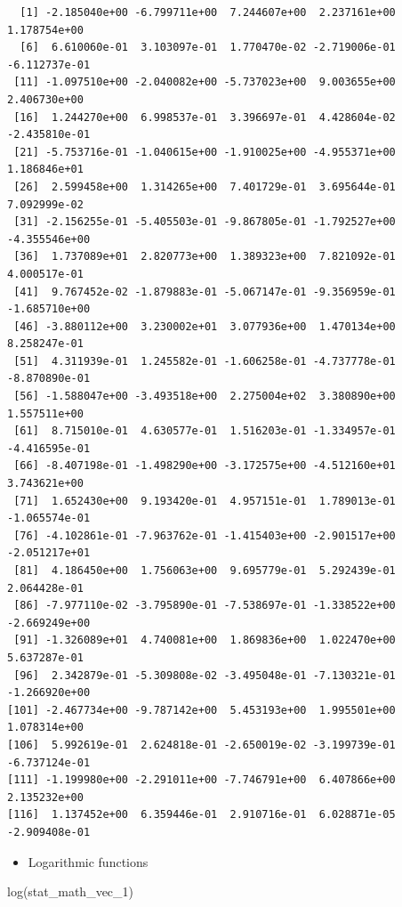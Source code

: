 \documentclass[
  letterpaper,
  DIV=11,
  numbers=noendperiod]{scrreprt}
\newenvironment{Shaded}{\begin{snugshade}}{\end{snugshade}}
\newcommand{\FunctionTok}[1]{\textcolor[rgb]{0.28,0.35,0.67}{#1}}
\newcommand{\NormalTok}[1]{\textcolor[rgb]{0.00,0.23,0.31}{#1}}
\providecommand{\tightlist}{%
  \setlength{\itemsep}{0pt}\setlength{\parskip}{0pt}}\usepackage{longtable,booktabs,array}
\begin{document}
\begin{verbatim}
  [1] -2.185040e+00 -6.799711e+00  7.244607e+00  2.237161e+00  1.178754e+00
  [6]  6.610060e-01  3.103097e-01  1.770470e-02 -2.719006e-01 -6.112737e-01
 [11] -1.097510e+00 -2.040082e+00 -5.737023e+00  9.003655e+00  2.406730e+00
 [16]  1.244270e+00  6.998537e-01  3.396697e-01  4.428604e-02 -2.435810e-01
 [21] -5.753716e-01 -1.040615e+00 -1.910025e+00 -4.955371e+00  1.186846e+01
 [26]  2.599458e+00  1.314265e+00  7.401729e-01  3.695644e-01  7.092999e-02
 [31] -2.156255e-01 -5.405503e-01 -9.867805e-01 -1.792527e+00 -4.355546e+00
 [36]  1.737089e+01  2.820773e+00  1.389323e+00  7.821092e-01  4.000517e-01
 [41]  9.767452e-02 -1.879883e-01 -5.067147e-01 -9.356959e-01 -1.685710e+00
 [46] -3.880112e+00  3.230002e+01  3.077936e+00  1.470134e+00  8.258247e-01
 [51]  4.311939e-01  1.245582e-01 -1.606258e-01 -4.737778e-01 -8.870890e-01
 [56] -1.588047e+00 -3.493518e+00  2.275004e+02  3.380890e+00  1.557511e+00
 [61]  8.715010e-01  4.630577e-01  1.516203e-01 -1.334957e-01 -4.416595e-01
 [66] -8.407198e-01 -1.498290e+00 -3.172575e+00 -4.512160e+01  3.743621e+00
 [71]  1.652430e+00  9.193420e-01  4.957151e-01  1.789013e-01 -1.065574e-01
 [76] -4.102861e-01 -7.963762e-01 -1.415403e+00 -2.901517e+00 -2.051217e+01
 [81]  4.186450e+00  1.756063e+00  9.695779e-01  5.292439e-01  2.064428e-01
 [86] -7.977110e-02 -3.795890e-01 -7.538697e-01 -1.338522e+00 -2.669249e+00
 [91] -1.326089e+01  4.740081e+00  1.869836e+00  1.022470e+00  5.637287e-01
 [96]  2.342879e-01 -5.309808e-02 -3.495048e-01 -7.130321e-01 -1.266920e+00
[101] -2.467734e+00 -9.787142e+00  5.453193e+00  1.995501e+00  1.078314e+00
[106]  5.992619e-01  2.624818e-01 -2.650019e-02 -3.199739e-01 -6.737124e-01
[111] -1.199980e+00 -2.291011e+00 -7.746791e+00  6.407866e+00  2.135232e+00
[116]  1.137452e+00  6.359446e-01  2.910716e-01  6.028871e-05 -2.909408e-01
\end{verbatim}

\begin{itemize}
\tightlist
\item
  Logarithmic functions
\end{itemize}

\begin{Shaded}
\begin{Highlighting}[]
\FunctionTok{log}\NormalTok{(stat\_math\_vec\_1)}
\end{Highlighting}
\end{Shaded}
\end{document}
